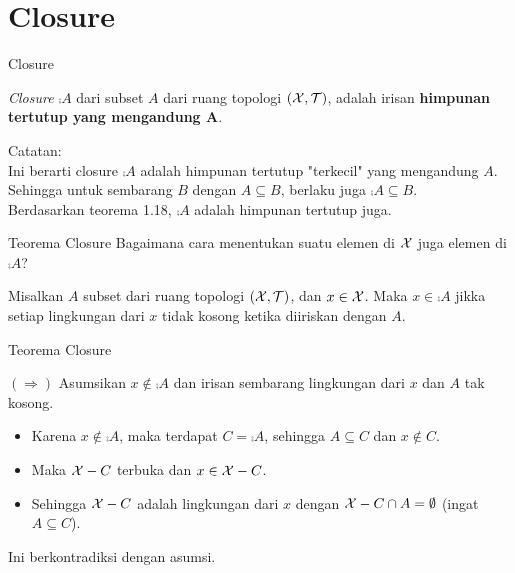 \section*{Closure}
\begin{frame}{Closure}
    \begin{tcolorbox}[enhanced,title=Definisi, frame style tile={width=\paperwidth}{\wallpaper}]
        \textit{Closure} $\comp{A}$ dari subset $A$ dari ruang topologi $(\mathcal{X},\mathcal{T})$, 
        adalah irisan \textbf{himpunan tertutup yang mengandung A}.
    \end{tcolorbox}
Catatan:\\
Ini berarti closure $\comp{A}$ adalah himpunan tertutup "terkecil" yang mengandung $A$. 
Sehingga untuk sembarang $B$ dengan $A\subseteq B$, berlaku juga $\comp{A} \subseteq B$.\\
Berdasarkan teorema 1.18, $\comp{A}$ adalah himpunan tertutup juga.
\end{frame}

\begin{frame}{Teorema Closure}
Bagaimana cara menentukan suatu elemen di $\mathcal{X}$ juga elemen di $\comp{A}$?  
\begin{tcolorbox}[enhanced,title=Teorema 1.19, frame style tile={width=\paperwidth}{\wallpaper}]
    Misalkan $A$ subset dari ruang topologi $(\mathcal{X},\mathcal{T})$, dan $x\in \mathcal{X}$.
    Maka $x\in\comp{A}$ jikka setiap lingkungan dari $x$ tidak kosong ketika diiriskan dengan $A$.
\end{tcolorbox}
\end{frame}

\begin{frame}{Teorema Closure} 
    \begin{tcolorbox}[enhanced,title=Teorema 1.19 (Bukti), frame style tile={width=\paperwidth}{\wallpaper}]
        $(\Rightarrow)$ Asumsikan $x\notin \comp{A}$ dan irisan sembarang lingkungan dari $x$ dan $A$ tak kosong.\\
        \begin{itemize}
            \item Karena $x\notin \comp{A}$, maka terdapat $C=\comp{A}$, sehingga $A\subseteq C$ dan $x\notin C$. 
            \item Maka $\mathcal{X}-C$ terbuka dan $x\in \mathcal{X}-C$.
            \item Sehingga $\mathcal{X}-C$ adalah lingkungan dari $x$ dengan $\mathcal{X}-C \cap A = \emptyset$ (ingat $A\subseteq C$).
        \end{itemize}
        
        Ini berkontradiksi dengan asumsi.
    \end{tcolorbox}
\end{frame}

